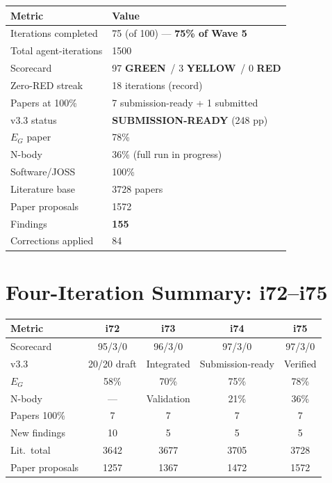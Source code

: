 \documentclass[11pt,a4paper]{article}
\newcommand{\GREEN}{\textcolor{dfdgreen}{\textbf{GREEN}}}
\newcommand{\YELLOW}{\textcolor{dfdyellow}{\textbf{YELLOW}}}
\newcommand{\RED}{\textcolor{dfdred}{\textbf{RED}}}
\begin{document}
\begin{center}
\begin{tabular}{ll}
\toprule
\textbf{Metric} & \textbf{Value} \\
\midrule
Iterations completed & 75 (of 100) --- \textbf{75\% of Wave 5} \\
Total agent-iterations & 1500 \\
Scorecard & 97 \GREEN\ / 3 \YELLOW\ / 0 \RED \\
Zero-RED streak & 18 iterations (record) \\
Papers at 100\% & 7 submission-ready + 1 submitted \\
v3.3 status & \textbf{SUBMISSION-READY} (248 pp) \\
$E_G$ paper & 78\% \\
N-body & 36\% (full run in progress) \\
Software/JOSS & 100\% \\
Literature base & 3728 papers \\
Paper proposals & 1572 \\
Findings & \textbf{155} \\
Corrections applied & 84 \\
\bottomrule
\end{tabular}
\end{center}

\section{Four-Iteration Summary: i72--i75}

\begin{center}
\begin{tabular}{lcccc}
\toprule
\textbf{Metric} & \textbf{i72} & \textbf{i73} & \textbf{i74} & \textbf{i75} \\
\midrule
Scorecard & 95/3/0 & 96/3/0 & 97/3/0 & 97/3/0 \\
v3.3 & 20/20 draft & Integrated & Submission-ready & Verified \\
$E_G$ & 58\% & 70\% & 75\% & 78\% \\
N-body & --- & Validation & 21\% & 36\% \\
Papers 100\% & 7 & 7 & 7 & 7 \\
New findings & 10 & 5 & 5 & 5 \\
Lit.\ total & 3642 & 3677 & 3705 & 3728 \\
Paper proposals & 1257 & 1367 & 1472 & 1572 \\
\bottomrule
\end{tabular}
\end{center}
\end{document}
